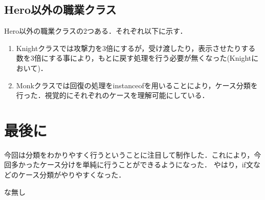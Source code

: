 \documentclass{jlreq}
\begin{document}
  \subsection{Hero以外の職業クラス}
  Hero以外の職業クラスの$2$つある．それぞれ以下に示す．
  \begin{enumerate}[(1). ]
    \item Knightクラスでは攻撃力を$3$倍にするが，受け渡したり，表示させたりする数を$3$倍にする事により，もとに戻す処理を行う必要が無くなった(Knightにおいて)．
    \item Monkクラスでは回復の処理をinstanceofを用いることにより，ケース分類を行った．視覚的にそれぞれのケースを理解可能にしている．
  \end{enumerate}

  \section{最後に}
  今回は分類をわかりやすく行うということに注目して制作した．これにより，今回多かったケース分けを単純に行うことができるようになった．
  やはり，if文などのケース分類がやりやすくなった．

  \begin{thebibliography}{99}
    \bibitem な無し
  \end{thebibliography}
\end{document}
